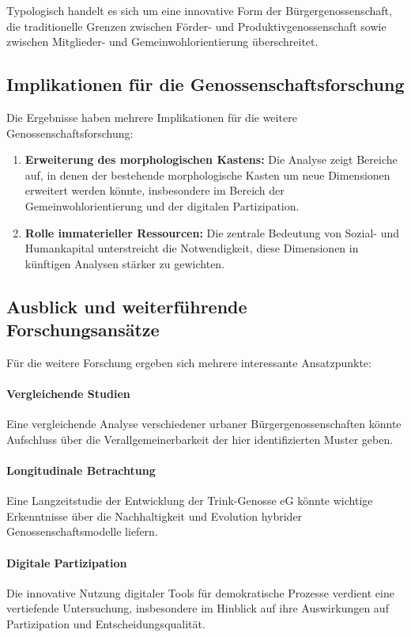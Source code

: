 Typologisch handelt es sich um eine innovative Form der Bürgergenossenschaft, die traditionelle Grenzen zwischen Förder- und Produktivgenossenschaft sowie zwischen Mitglieder- und Gemeinwohlorientierung überschreitet.

\subsection{Implikationen für die Genossenschaftsforschung}

Die Ergebnisse haben mehrere Implikationen für die weitere Genossenschaftsforschung:

\begin{enumerate}
\item \textbf{Erweiterung des morphologischen Kastens:} Die Analyse zeigt Bereiche auf, in denen der bestehende morphologische Kasten um neue Dimensionen erweitert werden könnte, insbesondere im Bereich der Gemeinwohlorientierung und der digitalen Partizipation.

\item \textbf{Rolle immaterieller Ressourcen:} Die zentrale Bedeutung von Sozial- und Humankapital unterstreicht die Notwendigkeit, diese Dimensionen in künftigen Analysen stärker zu gewichten.
\end{enumerate}

\subsection{Ausblick und weiterführende Forschungsansätze}

Für die weitere Forschung ergeben sich mehrere interessante Ansatzpunkte:

\paragraph{Vergleichende Studien}
Eine vergleichende Analyse verschiedener urbaner Bürgergenossenschaften könnte Aufschluss über die Verallgemeinerbarkeit der hier identifizierten Muster geben.

\paragraph{Longitudinale Betrachtung}
Eine Langzeitstudie der Entwicklung der Trink-Genosse eG könnte wichtige Erkenntnisse über die Nachhaltigkeit und Evolution hybrider Genossenschaftsmodelle liefern.

\paragraph{Digitale Partizipation}
Die innovative Nutzung digitaler Tools für demokratische Prozesse verdient eine vertiefende Untersuchung, insbesondere im Hinblick auf ihre Auswirkungen auf Partizipation und Entscheidungsqualität.

